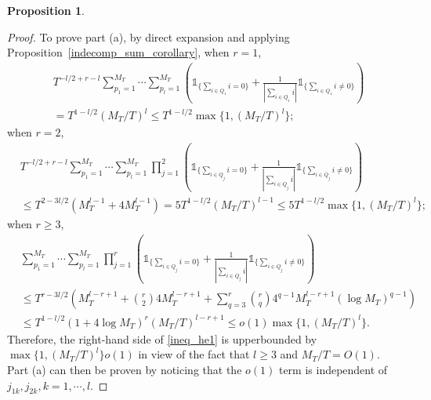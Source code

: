 \documentclass[11pt]{article}
\numberwithin{equation}{section}
\theoremstyle{plain}
\theoremstyle{definition}
\theoremstyle{definition}
\theoremstyle{assumption}
\theoremstyle{proposition}
\newtheorem{proposition}{Proposition}[section]
\theoremstyle{proposition}
\theoremstyle{example}
\theoremstyle{lemma}
\theoremstyle{theorem}
\theoremstyle{remark}
\begin{document}
\begin{proposition}
\begin{proof}
To prove part (a), by direct expansion and applying Proposition~\ref{indecomp_sum_corollary}, when $r=1$,
\begin{align*}
&T^{-l/2+r-l}\sum_{p_1=1}^{M_T}\cdots\sum_{p_l=1}^{M_T}  \left( \mathds{1}_{\{\sum_{i\in Q_1}i = 0\}} + \frac{1}{|\sum_{i\in Q_1}i|}\mathds{1}_{\{\sum_{i\in Q_1}i \neq 0\}}\right) \\
&= T^{1-l/2} (M_T/T)^{l} 
\leqslant T^{1-l/2}\max\{1, (M_T/T)^{l}\};
\end{align*}
when $r=2$,
\begin{align*}
&T^{-l/2+r-l}\sum_{p_1=1}^{M_T}\cdots\sum_{p_l=1}^{M_T}  \prod_{j=1}^2\left( \mathds{1}_{\{\sum_{i\in Q_j}i = 0\}} + \frac{1}{|\sum_{i\in Q_j}i|}\mathds{1}_{\{\sum_{i\in Q_j}i \neq 0\}}\right) \\
&\leqslant T^{2-3l/2}(M_T^{l-1} + 4M_T^{l-1})
= 5T^{1 - l/2} (M_T/T)^{l-1}
\leqslant 5T^{1-l/2}\max\{1, (M_T/T)^{l}\};
\end{align*}
when $r\geqslant3$,
\begin{align*}
&\sum_{p_1=1}^{M_T}\cdots\sum_{p_l=1}^{M_T} \prod_{j=1}^{r}  \left( \mathds{1}_{\{\sum_{i\in Q_j}i = 0\}} + \frac{1}{|\sum_{i\in Q_j}i|}\mathds{1}_{\{\sum_{i\in Q_j}i \neq 0\}}\right) \\
&\leqslant T^{r - 3l/2} \left(M_T^{l-r+1} + {r \choose 2} 4M_T^{l-r+1} + \sum_{q=3}^{r}{r \choose q}4^{q-1}M_T^{l-r+1} (\log M_T)^{q-1} \right) \\
&\leqslant T^{1 - l/2} (1 + 4\log M_T)^{r} (M_T/T)^{l-r+1}
\leqslant o(1)\max\{1, (M_T/T)^{l}\} .
\end{align*}
Therefore, the right-hand side of \eqref{ineq_he1} is upperbounded by $\max\{1, (M_T/T)^{l}\}o(1)$ in view of the fact that $l\geqslant 3$ and $M_T/T = O(1)$. Part (a) can then be proven by noticing that the $o(1)$ term is independent of $j_{1k},j_{2k},k=1,\cdots,l$.


\end{proof}
\end{proposition}
\end{document}
